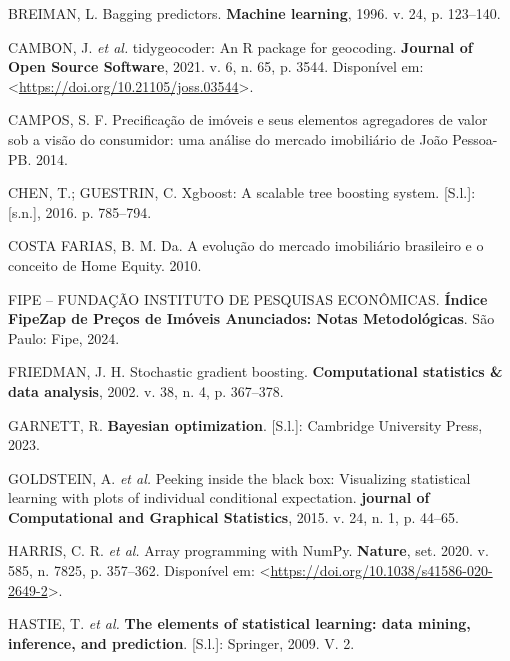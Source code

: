 \documentclass[
  12pt,
  a4paper,
]{scrreprt}
\newlength{\cslhangindent}
\newenvironment{CSLReferences}[2] %
 {\begin{list}{}{%
  \setlength{\itemindent}{0pt}
  \setlength{\leftmargin}{0pt}
  \setlength{\parsep}{0pt}
  \ifodd #1
   \setlength{\leftmargin}{\cslhangindent}
   \setlength{\itemindent}{-1\cslhangindent}
  \fi
  \setlength{\itemsep}{#2\baselineskip}}}
 {\end{list}}
\begin{document}
\begin{CSLReferences}{0}{1}
BREIMAN, L. Bagging predictors. \textbf{Machine learning}, 1996. v. 24,
p. 123--140.

CAMBON, J. \emph{et al.} tidygeocoder: An R package for geocoding.
\textbf{Journal of Open Source Software}, 2021. v. 6, n. 65, p. 3544.
Disponível em:
\textless{}\url{https://doi.org/10.21105/joss.03544}\textgreater.

CAMPOS, S. F. Precifica{ç}{ã}o de im{ó}veis e seus elementos agregadores
de valor sob a vis{ã}o do consumidor: uma an{á}lise do mercado
imobili{á}rio de Jo{ã}o Pessoa-PB. 2014.

CHEN, T.; GUESTRIN, C. Xgboost: A scalable tree boosting system.
{[}S.l.{]}: {[}s.n.{]}, 2016. p. 785--794.

COSTA FARIAS, B. M. Da. A evolu{ç}{ã}o do mercado imobili{á}rio
brasileiro e o conceito de Home Equity. 2010.

FIPE -- FUNDAÇÃO INSTITUTO DE PESQUISAS ECONÔMICAS. \textbf{Índice
FipeZap de Preços de Imóveis Anunciados: Notas Metodológicas}. São
Paulo: Fipe, 2024.

FRIEDMAN, J. H. Stochastic gradient boosting. \textbf{Computational
statistics \& data analysis}, 2002. v. 38, n. 4, p. 367--378.

GARNETT, R. \textbf{Bayesian optimization}. {[}S.l.{]}: Cambridge
University Press, 2023.

GOLDSTEIN, A. \emph{et al.} Peeking inside the black box: Visualizing
statistical learning with plots of individual conditional expectation.
\textbf{journal of Computational and Graphical Statistics}, 2015. v. 24,
n. 1, p. 44--65.

HARRIS, C. R. \emph{et al.} Array programming with {NumPy}.
\textbf{Nature}, set. 2020. v. 585, n. 7825, p. 357--362. Disponível em:
\textless{}\url{https://doi.org/10.1038/s41586-020-2649-2}\textgreater.

HASTIE, T. \emph{et al.} \textbf{The elements of statistical learning:
data mining, inference, and prediction}. {[}S.l.{]}: Springer, 2009. V.
2.


\end{CSLReferences}
\end{document}
